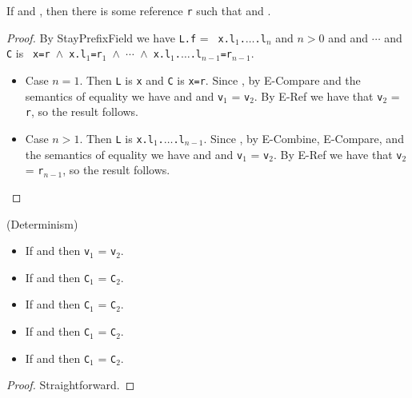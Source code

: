 \begin{Lemma}
\label{lem:stayPrefix}
If \emph{} and
\emph{}, then there is some
reference {\tt r} such that 
\emph{} and
\emph{}.
\end{Lemma}
\begin{proof}
By {\sc StayPrefixField} we have {\tt L.f} = {\tt
x.l$_1$.$\ldots$.l$_n$} and $n>0$ and 
and  $\cdots$
 and {\tt
  C} is {\tt
  x=r\,$\wedge$\,x.l$_1$=r$_1$\,$\wedge$\,$\cdots$\,$\wedge$\,x.l$_1$.$\ldots$.l$_{n-1}$=r$_{n-1}$}.  
\begin{itemize}
\item Case $n=1$.  Then {\tt L} is {\tt x} and {\tt C} is {\tt x=r}.
  Since , by {\sc E-Compare} and
  the semantics of equality we have 
   and
   and {\tt v$_1$} = {\tt v$_2$}.  By
{\sc E-Ref} we have that {\tt v$_2$} = {\tt r}, so the result follows.
\item Case $n>1$.  Then {\tt L} is {\tt x.l$_1$.$\ldots$.l$_{n-1}$}.
  Since , by {\sc E-Combine}, {\sc E-Compare}, and
  the semantics of equality we have 
   and
   and {\tt v$_1$} = {\tt v$_2$}.  By
{\sc E-Ref} we have that {\tt v$_2$} = {\tt r$_{n-1}$}, so the result follows.
\end{itemize}
\end{proof}

\begin{Lemma}
\label{lem:det}
(Determinism)
\begin{itemize}
\item If  and 
then {\tt v$_1$} = {\tt v$_2$}.
\item If  and 
  then {\tt C$_1$} = {\tt C$_2$}.
\item If  and 
  then {\tt C$_1$} = {\tt C$_2$}.
\item If  and  
  then {\tt C$_1$} = {\tt C$_2$}.
\item If  and  
  then {\tt C$_1$} = {\tt C$_2$}.
\end{itemize}
\end{Lemma}
\begin{proof}
Straightforward.
\end{proof}

